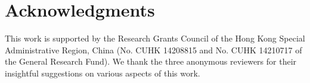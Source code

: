 \documentclass[letterpaper]{article} %
\begin{document}
\section{ Acknowledgments}
This work is supported by the Research Grants
Council of the Hong Kong Special Administrative Region, China (No. CUHK 14208815 and
No. CUHK 14210717 of the General Research
Fund). We thank the three anonymous
reviewers for their insightful suggestions on various
aspects of this work.



\end{document}
